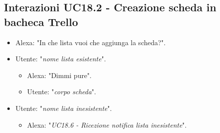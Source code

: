 \subsection{Interazioni UC18.2 - Creazione scheda in bacheca Trello}
\label{sec:connettore_trello_crea_bacheca}
 \begin{itemize}
        \item Alexa: "In che lista vuoi che aggiunga la scheda?".
        \item Utente: "{\it nome lista esistente}".
        \begin{itemize}
        \item Alexa: "Dimmi pure".
        \item Utente: "{\it corpo scheda}".
           \end{itemize}
        \item Utente: "{\it nome lista inesistente}".
           \begin{itemize}
        \item Alexa: "{\it UC18.6 - Ricezione notifica lista inesistente}".
           \end{itemize}
    \end{itemize}


